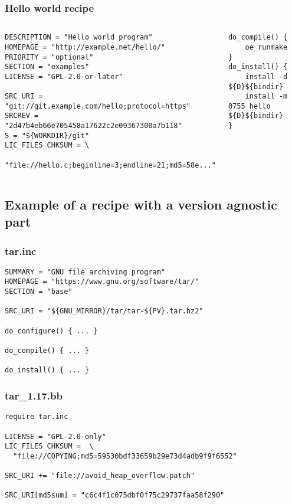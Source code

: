 \begin{frame}[fragile]
  \frametitle{Hello world recipe}
  \begin{columns}
  \begin{block}{}
    \begin{verbatim}
DESCRIPTION = "Hello world program"
HOMEPAGE = "http://example.net/hello/"
PRIORITY = "optional"
SECTION = "examples"
LICENSE = "GPL-2.0-or-later"

SRC_URI = "git://git.example.com/hello;protocol=https"
SRCREV = "2d47b4eb66e705458a17622c2e09367300a7b118"
S = "${WORKDIR}/git"
LIC_FILES_CHKSUM = \
  "file://hello.c;beginline=3;endline=21;md5=58e..."
    \end{verbatim}
  \end{block}

  \begin{block}{}
    \begin{verbatim}
do_compile() {
    oe_runmake
}
do_install() {
    install -d ${D}${bindir}
    install -m 0755 hello ${D}${bindir}
}
    \end{verbatim}
  \end{block}
  \end{columns}
\end{frame}

\subsection{Example of a recipe with a version agnostic part}

\begin{frame}[fragile]
  \frametitle{tar.inc}
  \begin{block}{}
    \begin{verbatim}
SUMMARY = "GNU file archiving program"
HOMEPAGE = "https://www.gnu.org/software/tar/"
SECTION = "base"

SRC_URI = "${GNU_MIRROR}/tar/tar-${PV}.tar.bz2"

do_configure() { ... }

do_compile() { ... }

do_install() { ... }
    \end{verbatim}
  \end{block}
\end{frame}

\begin{frame}[fragile]
  \frametitle{tar\_1.17.bb}
  \begin{block}{}
    \begin{verbatim}
require tar.inc

LICENSE = "GPL-2.0-only"
LIC_FILES_CHKSUM =  \
  "file://COPYING;md5=59530bdf33659b29e73d4adb9f9f6552"

SRC_URI += "file://avoid_heap_overflow.patch"

SRC_URI[md5sum] = "c6c4f1c075dbf0f75c29737faa58f290"
    \end{verbatim}
  \end{block}
\end{frame}

